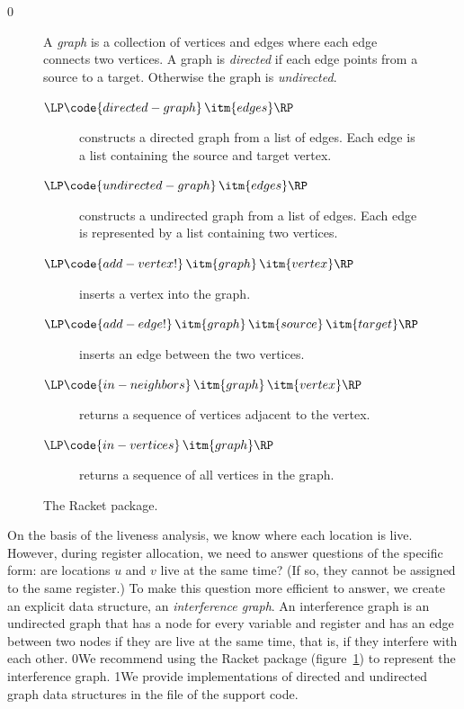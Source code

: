 \documentclass[7x10]{TimesAPriori_MIT}%
\def\racketEd{0}
\def\pythonEd{1}
\providecommand{\BookEdition}{1}
\let\edition\BookEdition
\newcommand{\racket}[1]{{\if\edition\racketEd{#1}\fi}}
\newcommand{\pythonColor}[0]{}
\newcommand{\python}[1]{{\if\edition\pythonEd\pythonColor #1\fi}}
\numberwithin{theorem}{chapter}
\numberwithin{definition}{chapter}
\numberwithin{equation}{chapter}
\begin{document}
{\if\edition\racketEd
\begin{figure}[tp]
  \small
  \begin{tcolorbox}[title=\href{https://docs.racket-lang.org/graph/index.html}{The Racket Graph Library}]
    A \emph{graph} is a collection of vertices and edges where each
    edge connects two vertices.  A graph is \emph{directed} if each
    edge points from a source to a target.  Otherwise the graph is
    \emph{undirected}.
  \begin{description}
  \item[$\LP\code{directed-graph}\,\itm{edges}\RP$] constructs a
    directed graph from a list of edges. Each edge is a list
    containing the source and target vertex.
  \item[$\LP\code{undirected-graph}\,\itm{edges}\RP$] constructs a
    undirected graph from a list of edges. Each edge is represented by
    a list containing two vertices.
  \item[$\LP\code{add-vertex!}\,\itm{graph}\,\itm{vertex}\RP$]
    inserts a vertex into the graph.
  \item[$\LP\code{add-edge!}\,\itm{graph}\,\itm{source}\,\itm{target}\RP$]
    inserts an edge between the two vertices.
  \item[$\LP\code{in-neighbors}\,\itm{graph}\,\itm{vertex}\RP$]
    returns a sequence of vertices adjacent to the vertex.
  \item[$\LP\code{in-vertices}\,\itm{graph}\RP$]
    returns a sequence of all vertices in the graph.
  \end{description}
\end{tcolorbox}
  \caption{The Racket  package.}
  \label{fig:graph}
\end{figure}
\fi}

On the basis of the liveness analysis, we know where each location is
live.  However, during register allocation, we need to answer
questions of the specific form: are locations $u$ and $v$ live at the
same time?  (If so, they cannot be assigned to the same register.)  To
make this question more efficient to answer, we create an explicit
data structure, an \emph{interference
  graph}.  An interference graph is
an undirected graph that has a node for every variable and register
and has an edge between two nodes if they are
live at the same time, that is, if they interfere with each other.
%
\racket{We recommend using the Racket  package
  (figure~\ref{fig:graph}) to represent the interference graph.}
%
\python{We provide implementations of directed and undirected graph
  data structures in the file \code{graph.py} of the support code.}
\end{document}
